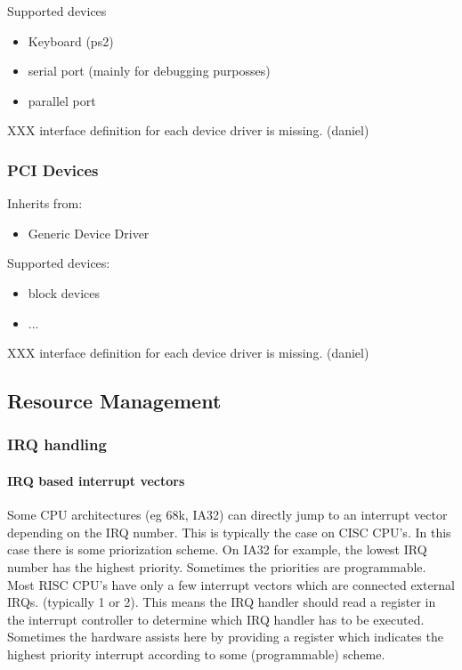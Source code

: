 \documentclass[9pt,a4paper]{extarticle}
\begin{document}
Supported devices
\begin{itemize}
\item Keyboard (ps2)
\item serial port (mainly for debugging purposses)
\item parallel port
\end{itemize}

XXX interface definition for each device driver is missing. (daniel)


\subsubsection{PCI Devices}
Inherits from:
\begin{itemize}
\item Generic Device Driver
\end{itemize}
  
Supported devices:
\begin{itemize}
\item block devices
\item ...
\end{itemize}

XXX interface definition for each device driver is missing. (daniel)


\subsection{Resource Management}


\subsubsection{IRQ handling}

\paragraph{IRQ based interrupt vectors}

Some CPU architectures (eg 68k, IA32) can directly jump to an
interrupt vector depending on the IRQ number. This is typically the
case on CISC CPU's. In this case there is some priorization scheme. On
IA32 for example, the lowest IRQ number has the highest priority.
Sometimes the priorities are programmable.  Most RISC CPU's have only
a few interrupt vectors which are connected external IRQs. (typically
1 or 2). This means the IRQ handler should read a register in the
interrupt controller to determine which IRQ handler has to be
executed.  Sometimes the hardware assists here by providing a register
which indicates the highest priority interrupt according to some
(programmable) scheme.
\end{document}
